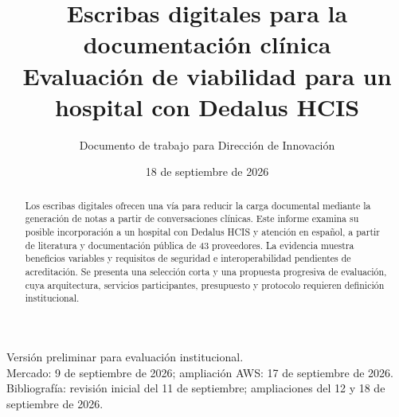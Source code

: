 \documentclass[11pt,a4paper]{article}
\title{Escribas digitales para la documentación clínica\\\large Evaluación de viabilidad para un hospital con Dedalus HCIS}
\author{Documento de trabajo para Dirección de Innovación}
\date{18 de septiembre de 2026}
\begin{document}
\maketitle
\begin{center}
\small Versión preliminar para evaluación institucional.\\
Mercado: 9 de septiembre de 2026; ampliación AWS: 17 de septiembre de 2026.\\
Bibliografía: revisión inicial del 11 de septiembre; ampliaciones del 12 y 18 de septiembre de 2026.
\end{center}

\begin{abstract}
Los escribas digitales ofrecen una vía para reducir la carga documental mediante la generación de notas a partir de conversaciones clínicas. Este informe examina su posible incorporación a un hospital con Dedalus HCIS y atención en español, a partir de literatura y documentación pública de 43 proveedores. La evidencia muestra beneficios variables y requisitos de seguridad e interoperabilidad pendientes de acreditación. Se presenta una selección corta y una propuesta progresiva de evaluación, cuya arquitectura, servicios participantes, presupuesto y protocolo requieren definición institucional.
\end{abstract}

\begingroup
\small
\setlength{\parskip}{0pt}
\tableofcontents
\endgroup
\clearpage










\clearpage
\printbibliography[heading=bibintoc,notkeyword=tecnica,title={Referencias bibliográficas}]

\clearpage
\appendix






\end{document}

